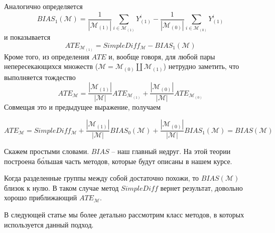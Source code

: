\documentclass{article}
\begin{document}
        Аналогично определяется
        \[
            BIAS_1(\mathcal{M}) =
            \frac{1}{|\mathcal{M}_{(1)}|} \displaystyle\sum_{i\in\mathcal{M}_{(1)}}
            Y^i_{(1)} -
            \frac{1}{|\mathcal{M}_{(0)}|} \displaystyle\sum_{i\in\mathcal{M}_{(0)}}
            Y^i_{(1)}
        \]
        и показывается
        \[
            ATE_{\mathcal{M}_{(1)}} = SimpleDiff_\mathcal{M} - BIAS_1(\mathcal{M})
        \]
        Кроме того, из определения $ATE$ и, вообще говоря, для любой пары непересекающихся множеств ($\mathcal{M} = \mathcal{M}_{(0)} \amalg \mathcal{M}_{(1)}$) нетрудно заметить, что выполняется тождество
        \[
            ATE_\mathcal{M} =
            \frac{|\mathcal{M}_{(1)}|}{|\mathcal{M}|} ATE_{\mathcal{M}_{(1)} }+
            \frac{|\mathcal{M}_{(0)}|}{|\mathcal{M}|} ATE_{\mathcal{M}_{(0)}}
        \]
        Совмещая это и предыдущее выражение, получаем

        \[
            ATE_\mathcal{M} =
            SimpleDiff_\mathcal{M} +
            \frac{|\mathcal{M}_{(1)}|}{|\mathcal{M}|} BIAS_0(\mathcal{M}) +
            \frac{|\mathcal{M}_{(0)}|}{|\mathcal{M}|} BIAS_1(\mathcal{M})
            =
            BIAS(\mathcal{M})
        \]

        Скажем простыми словами.
        $BIAS$ -- наш главный недруг.
        На этой теории построена б\'{о}льшая часть методов, которые будут описаны в нашем курсе.

        Когда разделенные группы между собой достаточно похожи, то $BIAS(\mathcal{M})$ близок к нулю.
        В таком случае метод $SimpleDiff$ вернет результат, довольно хорошо приближающий $ATE_\mathcal{M}$.

        В следующей статье мы более детально рассмотрим класс методов, в которых используется данный подход.
\end{document}
